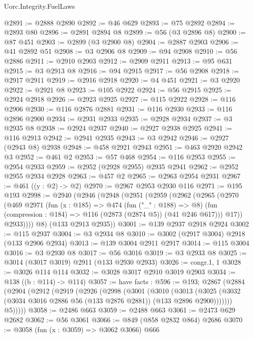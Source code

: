 \begin{lexlean}{Uorc.Integrity.FuelLaws}
\begin{coremodule}
@2891 := @2888 @2890
@2892 := @46 @629
@2893 := @75 @2892
@2894 := @2893 @80
@2896 := @2891 @2894 @8
@2899 := @56 (@3 @2896 @8)
@2900 := @87 @451
@2903 := @2899 (@3 @2900 @8)
@2904 := @2887 @2903
@2906 := @41 @2892 @51
@2908 := @3 @2906 @8
@2909 := @94 @2908
@2910 := @56 @2886
@2911 := @2910 @2903
@2912 := @2909 @2911
@2913 := @95 @631
@2915 := @3 @2913 @8
@2916 := @94 @2915
@2917 := @56 @2908
@2918 := @2917 @2911
@2919 := @2916 @2918
@2920 := @4 @451
@2921 := @3 @2920
@2922 := @2921 @8
@2923 := @105 @2922
@2924 := @56 @2915
@2925 := @2924 @2918
@2926 := @2923 @2925
@2927 := @115 @2922
@2928 := @116 @2906
@2930 := @116 @2876 @2881
@2931 := @116 @2930
@2933 := @116 @2896 @2900
@2934 := @2931 @2933
@2935 := @2928 @2934
@2937 := @3 @2935 @8
@2938 := @2924 @2937
@2940 := @2927 @2938 @2925
@2941 := @116 @2913
@2942 := @2941 @2935
@2943 := @3 @2942
@2946 := @2927 (@2943 @8) @2938
@2948 := @458 @2921 @2943
@2951 := @463 @2920 @2942 @3
@2952 := @461 @2
@2953 := @57 @468
@2954 := @116 @2953
@2955 := @2954 @2933
@2959 := @2952 (@2928 @2955) @2935 @2941
@2962 := @2952 @2955 @2934 @2928
@2963 := @457 @2
@2965 := @2963 @2954 @2931
@2967 := @461 ((y : @2) -> @2)
@2970 := @2967 @2953 @2930 @116
@2971 := @195 @193
@2998 := @2940
    (@2946
      (@2948
        (@2951
          (@2959
            (@2962
              (@2965
                (@2970
                  (@469
                    @2971
                    (fun (x : @185) =>
                    @474
                      (fun ("_" : @188) => @8)
                      (fun (compression : @184) => @116 (@2873 (@2874 @5)) (@41 @246 @617)))
                    @17))
                @2933))))
        @8)
      (@133 @2913 @2935))
@3001 := @139 @2937 @2918 @2924
@3002 := @115 @2937
@3004 := @3 @2934 @8
@3010 := @3002 (@2917 @3004) @2918 (@133 @2906 @2934)
@3013 := @139 @3004 @2911 @2917
@3014 := @115 @3004
@3016 := @3 @2930 @8
@3017 := @56 @3016
@3019 := @3 @2933 @8
@3025 := @3014 (@3017 @3019) @2911 (@133 @2930 @2933)
@3026 := congr.{1, 1}
@3028 := @3026 @114 @114
@3032 := @3028 @3017 @2910 @3019 @2903
@3034 := @138 ((b : @114) -> @114)
@3057 := have facts : @596 := @193;
  @2867
    (@2884
      (@2904
        (@2912
          (@2919
            (@2926
              (@2998
                (@3001
                  (@3010
                    (@3013
                      (@3025
                        (@3032 (@3034 @3016 @2886 @56 (@133 @2876 @2881)) (@133 @2896 @2900)))))))
              @5)))))
@3058 := @2486 @663
@3059 := @2488 @663
@3061 := @2473 @629 @2682
@3062 := @56 @3061
@3066 := @849 (@858 @2832 @864) @2686
@3070 := @3058 (fun (x : @3059) => @3062 @3066) @666

\end{coremodule}
\end{lexlean}

